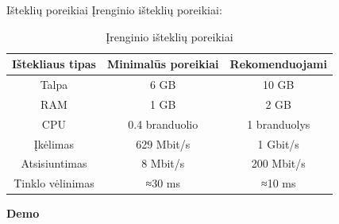 \documentclass[aspectratio=169,xcolor=dvipsnames]{beamer}
\begin{document}
\begin{frame}{Išteklių poreikiai}
    Įrenginio išteklių poreikiai:
    \begin{table}[H]
        \centering
        \begin{tabular}{|c|c|c|}
            \hline
            \textbf{Ištekliaus tipas} & {Minimalūs poreikiai} & {Rekomenduojami} \\ 
            \hline
            Talpa & 6 GB & 10 GB \\ 
            \hline
            RAM & 1 GB & 2 GB \\ 
            \hline
            CPU & 0.4 branduolio & 1 branduolys \\ 
            \hline
            Įkėlimas & 629 Mbit/s & 1 Gbit/s \\
            \hline
            Atsisiuntimas & 8 Mbit/s & 200 Mbit/s \\
            \hline
            Tinklo vėlinimas & ≈30 ms & ≈10 ms \\
            \hline
        \end{tabular}
        \caption{Įrenginio išteklių poreikiai}
        \label{tab:resource-types}
    \end{table}
\end{frame}



\begin{frame}
    \Huge{\centerline{\textbf{Demo}}}
\end{frame}

\end{document}
